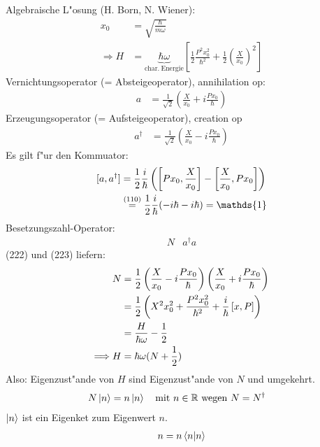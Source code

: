 \documentclass[a4paper]{scrartcl}
\newcommand{\RR}{\ensuremath \mathbb{R}}
\newcommand{\dOne}{\ensuremath \mathds{1}}
\begin{document}
{Algebraische L"osung (H. Born, N. Wiener):
\begin{align}
x_0 & = \sqrt {\frac{\hbar}{m \omega}} \\
\Longrightarrow H & = \underbrace{\hbar \omega}_{\mathrm{char. \  Energie}} \left[ \frac 12 \frac{P^2 x_0^2}{\hbar^2} + \frac 12 \left( \frac X {x_0} \right)^2 \right]
\end{align}
Vernichtungsoperator (= Absteigeoperator), annihilation op:
\begin{align}
a & = \frac1 {\sqrt 2} \left( \frac X {x_0} + i \frac {P x_0}{\hbar} \right)
\end{align}
Erzeugungsoperator (= Aufsteigeoperator), creation op
\begin{align}
a^\dagger & = \frac1 {\sqrt 2} \left( \frac X {x_0} - i \frac {P x_0}{\hbar} \right)
\end{align}
Es gilt f"ur den Kommuator:
\begin{align}
\begin{split}
[a, a^\dagger] & = \frac 12 \frac i \hbar \left( \left[ P x_0, \frac X {x_0} \right] - \left[ \frac X {x_0}, P x_0 \right] \right) \\
& \stackrel{(110)}= \frac 12 \frac i \hbar ( - i \hbar - i \hbar) = \dOne
\end{split}
\end{align}
Besetzungszahl-Operator: 
\begin{align}
N &  a^\dagger a
\end{align}
(222) und (223) liefern:
\begin{align}
N & = \frac 12 \left( \frac X {x_0} - i \frac {P x_0} \hbar \right) \left( \frac X {x_0} + i \frac{P x_0} \hbar \right) \notag \\
& = \frac 12 \left( X^2 {x_0^2} + \frac{P^2 x_0^2}{\hbar^2} + \frac i \hbar \left[ x, P \right] \right)  \notag \\
& = \frac H {\hbar \omega} - \frac12 \notag \\
\Longrightarrow H & = \hbar \omega ( N + \frac 12)
\end{align}
Also: Eigenzust"ande von $H$ sind Eigenzust"ande von $N$ und umgekehrt.
\begin{align}
N \ket n & = n \ket n \quad \mathrm{mit \ } n \in \RR \mathrm{ \ wegen \ } N = N^\dagger
\end{align}
$\ket n $ ist ein Eigenket zum Eigenwert $n$.
\begin{align}
\begin{split}
n & = n \braket {n | n } \\

\end{split}
\end{align}}
\end{document}
